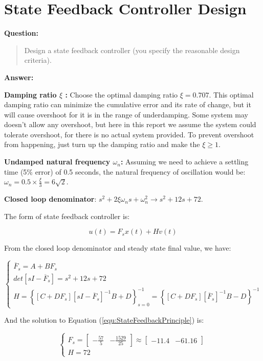 \documentclass[12pt, oneside]{article}
\begin{document}
\section{State Feedback Controller Design}
\textbf{Question:}
\begin{quote}
Design a state feedback controller (you specify the reasonable design criteria).
\end{quote}
\textbf{Answer:}

 \textbf{Damping ratio $\xi$ :} Choose the optimal damping ratio $\xi=0.707$. This optimal damping ratio can minimize the cumulative error and its rate of change\cite{optimal_damping_ratio}, but it will cause overshoot for it is in the range of underdamping. Some system may doesn't allow any overshoot, but here in this report we assume the system could tolerate overshoot, for there is no actual system provided. To prevent overshoot from happening, just turn up the damping ratio and make the $\xi \ge 1$.
 
 \textbf{Undamped natural frequency $\omega_n$:} Assuming we need to achieve a settling time (5\% error) of 0.5 seconds, the natural frequency of oscillation would be: $\omega_n = 0.5\times\frac{\xi}{3}=6\sqrt{2}.$

 \textbf{Closed loop denominator}: $s^2+2\xi\omega_{n}s+\omega_{n}^2 \rightarrow s^2+12s+72$.

The form of state feedback controller is:

\begin{equation}
    u(t) = F_{s}x(t)+Hv(t)
\end{equation}

 From the closed loop denominator and steady state final value, we have:

\begin{equation}
    \begin{cases}
        \overline{F}_s = A+BF_s\\
        det\left[sI-\overline{F}_s\right] = s^2+12s+72\\
        H = \left\{ \left[C+DF_s\right]\left[sI-\overline{F}_s\right]^{-1}B+D \right\}_{s=0}^{-1} = \left\{ \left[C+DF_s\right]\left[\overline{F}_s\right]^{-1}B-D \right\}^{-1}
    \end{cases}
    \label{equ:StateFeedbackPrinciple}
\end{equation}

And the solution to Equation (\ref{equ:StateFeedbackPrinciple}) is:
 
 \begin{equation}
     \begin{cases}
         F_s = \left[\begin{array}{ccc}-\frac{57}{5}&-\frac{1529}{25}\end{array}\right]\approx\left[\begin{array}{ccc}-11.4&-61.16\end{array}\right]\\
         H=72
     \end{cases}
 \end{equation}
\end{document}
